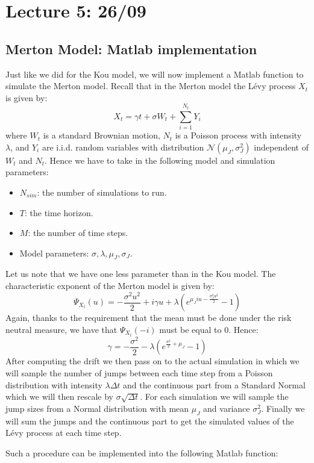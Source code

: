 \chapter{Lecture 5: 26/09}

\section{Merton Model: Matlab implementation}
Just like we did for the Kou model, we will now implement a Matlab function to
simulate the Merton model.
Recall that in the Merton model the L\'evy process $X_t$ is given by:
\[ X_t = \gamma t + \sigma W_t + \sum_{i=1}^{N_t} Y_i \]
where $W_t$ is a standard Brownian motion, $N_t$ is a Poisson process with
intensity $\lambda$, and $Y_i$ are i.i.d. random variables with distribution
$\mathcal{N}(\mu_J, \sigma_J^2)$ independent of $W_t$ and $N_t$.
Hence we have to take in the following model and simulation parameters:
\begin{itemize}
    \item $N_{sim}$: the number of simulations to run.
    \item $T$: the time horizon.
    \item $M$: the number of time steps.
    \item Model parameters: $\sigma, \lambda, \mu_J, \sigma_J$.
\end{itemize}
Let us note that we have one less parameter than in the Kou model.
The characteristic exponent of the Merton model is given by:
\[ \Psi_{X_t}(u) = -\frac{\sigma^2u^2}{2} + i\gamma u + \lambda \left( e^{
\mu_J iu - \frac{\sigma_J^2 u^2}{2}} - 1 \right) \]
Again, thanks to the requirement that the mean must be done under the risk
neutral measure, we have that $\Psi_{X_t}(-i)$ must be equal to $0$. Hence:
\[ \gamma = -\frac{\sigma^2}{2} - \lambda \left( e^{\frac{\sigma^2}{2} + \mu_J}
- 1 \right) \]
After computing the drift we then pass on to the actual simulation in which we
will sample the number of jumps between each time step from a Poisson
distribution with intensity $\lambda \Delta t$ and the continuous part from a
Standard Normal which we will then rescale by $\sigma \sqrt{\Delta t}$.
For each simulation we will sample the jump sizes from a Normal distribution
with mean $\mu_J$ and variance $\sigma_J^2$.
Finally we will sum the jumps and the continuous part to get the simulated
values of the L\'evy process at each time step.

Such a procedure can be implemented into the following Matlab function:

